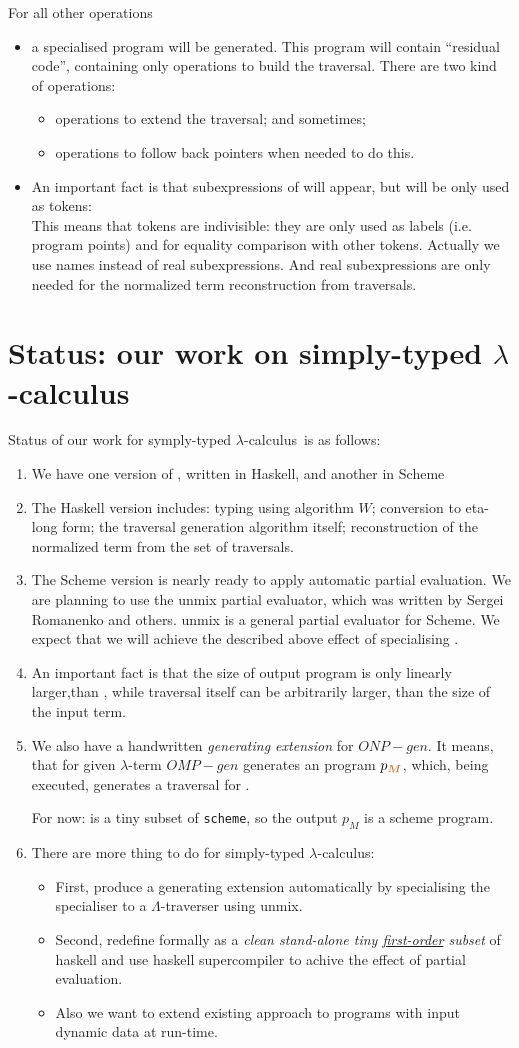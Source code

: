 \documentclass[a4paper, 10pt]{article}
\newcommand{\bi}{\begin{itemize}}
\newcommand{\ei}{\end{itemize}}
\newcommand{\be}{\begin{enumerate}}
\newcommand{\ee}{\end{enumerate}}
\newcommand{\ii}{\item}
\newcommand{\red}[1]{{\color{red}#1}}
\newcommand{\green}[1]{{\color{blue!20!black!30!green}#1}}
\newcommand{\blue}[1]{{\color{blue}#1}}
\newcommand{\lam}[1]{{\color{brown}\emph{\boldmath{#1}}}}
\newcommand{\lc}{$\lambda$-calculus}
\begin{document}
For all other operations
\bi
\ii a specialised program \lam{ONP$_M$} will be generated. This program will 
  contain ``residual code'', containing only operations to build the 
  traversal. There are two kind of operations:
  \bi
  \ii operations to extend the traversal; and sometimes;
  \ii operations to follow back pointers when needed to do this.
  \ei
\item An important fact is that subexpressions of \lam{$M$} will appear, but 
  will be only used as \red{tokens}:\\
  This means that tokens are \green{indivisible}: they are only used as labels 
  (i.e. program points) and for equality comparison with other tokens. 
  Actually we use names instead of real subexpressions. And real 
  subexpressions are only needed for the normalized term reconstruction from 
  traversals.
\ei


\section{Status: our work on simply-typed \lc}

Status of our work for symply-typed \lc \ is as follows:

\be
\ii We have one version of \lam{ONP}, written in \blue{\sc Haskell}, and 
  another in \blue{\sc Scheme}
\ii The {\sc Haskell} version includes: \green{typing} using algorithm $W$;
  \green{conversion to eta-long form; 
  the traversal generation algorithm itself; reconstruction of the normalized 
  term from the set of traversals}.
\ii The {\sc Scheme} version is nearly ready to apply automatic partial 
  evaluation. We are planning to use  the \blue{\sc unmix} partial evaluator, 
  which was written by Sergei Romanenko and others. 
  {\sc unmix} is a general partial evaluator for {\sc Scheme}. We expect that 
  we will achieve the described above effect of specialising \lam{ONP}.
\ii An important fact is that the size of output \lam{LLL} program is only 
  \red{linearly larger},than \lam{$M$}, while traversal itself can be 
  arbitrarily larger, than the size of the input term.
\ii We also have a handwritten \red{\em generating extension} for \lam{ONP}
  $ONP-gen$. It means, that for given $\lambda$-term \lam{$M$} $OMP-gen$ 
  generates an \lam{LLL} program $p_{\lam{$M$}}$, which, being executed, 
  generates a traversal for \lam{$M$}.

  \green{For now: \lam{LLL} is a tiny subset of {\tt scheme}, so the output 
  $p_M$ is a {\sc scheme} program}.
\ii There are more thing to do for simply-typed \lc:
  \bi
  \ii First, produce a generating extension \green{automatically} by 
    \blue{specialising the specialiser to a $\Lambda$-traverser} using 
    {\sc unmix}.
  \ii Second, redefine \lam{LLL} formally as a \emph{clean stand-alone tiny 
    \underline{first-order} subset} of {\sc haskell}
    and use haskell supercompiler to achive the effect of partial evaluation.
  \ii Also we want to extend existing approach to \green{programs with input 
    \red{dynamic} data} at run-time.
  \ei
\ee
\end{document}
